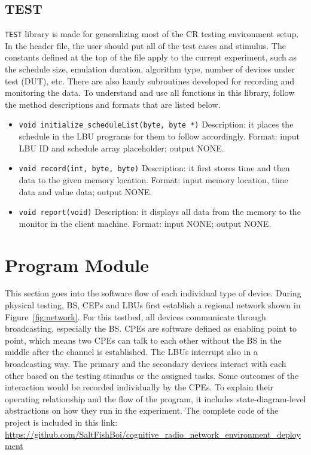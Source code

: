 \subsection{TEST}
\texttt{TEST} library is made for generalizing most of the CR testing environment setup. In the header file, the user should put all of the test cases and stimulus. The constants defined at the top of the file apply to the current experiment, such as the schedule size, emulation duration, algorithm type, number of devices under test (DUT), etc. There are also handy subroutines developed for recording and monitoring the data. To understand and use all functions in this library, follow the method descriptions and formats that are listed below.

\begin{itemize}
  \item \texttt{void initialize\_scheduleList(byte, byte *)}\newline
  Description: it places the schedule in the LBU programs for them to follow accordingly.\newline
  Format: input LBU ID and schedule array placeholder; output NONE.
  \item \texttt{void record(int, byte, byte)}\newline
  Description: it first stores time and then data to the given memory location.
  Format: input memory location, time data and value data; output NONE.
  \item \texttt{void report(void)}\newline
  Description: it displays all data from the memory to the monitor in the client machine.\newline
  Format: input NONE; output NONE.
\end{itemize}

\section{Program Module}

This section goes into the software flow of each individual type of device. During physical testing, BS, CEPs and LBUs first establish a regional network shown in Figure~\ref{fig:network}. For this testbed, all devices communicate through broadcasting, especially the BS. CPEs are software defined as enabling point to point, which means two CPEs can talk to each other without the BS in the middle after the channel is established. The LBUs interrupt also in a broadcasting way. The primary and the secondary devices interact with each other based on the testing stimulus or the assigned tasks. Some outcomes of the interaction would be recorded individually by the CPEs. To explain their operating relationship and the flow of the program, it includes state-diagram-level abstractions on how they run in the experiment. The complete code of the project is included in this link: \newline \url{https://github.com/SaltFishBoi/cognitive_radio_network_environment_deployment} 

